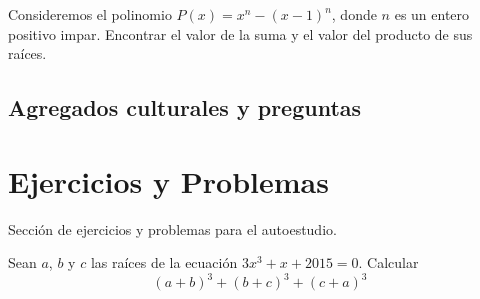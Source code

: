 \begin{example}
    Consideremos el polinomio $P(x) = x^n - (x - 1)^n$, donde $n$ es un entero positivo impar.
    Encontrar el valor de la suma y el valor del producto de sus raíces.
\end{example}

\subsection{Agregados culturales y preguntas}
{

}

\section{Ejercicios y Problemas}
{
    Sección de ejercicios y problemas para el autoestudio.

    \begin{section-problem}
        Sean $a$, $b$ y $c$ las raíces de la ecuación $3x^3 + x + 2015 = 0$.
        Calcular \[(a + b)^3 + (b + c)^3 + (c + a)^3\]
    \end{section-problem}
}
